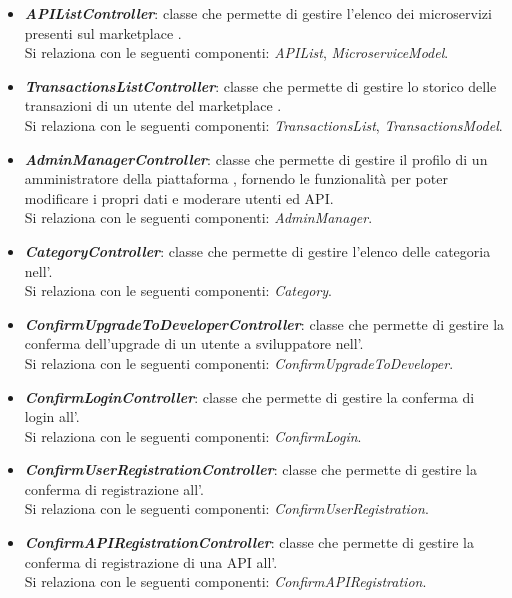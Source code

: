 \begin{itemize}
\begin{itemize}
		\item \textbf{\textit{APIListController}}: classe che permette di gestire l'elenco dei microservizi presenti sul marketplace \progetto.\\
		Si relaziona con le seguenti componenti: \textit{APIList}, \textit{MicroserviceModel}.
		
		\item \textbf{\textit{TransactionsListController}}: classe che permette di gestire lo storico delle transazioni di un utente del marketplace \progetto.\\
		Si relaziona con le seguenti componenti: \textit{TransactionsList}, \textit{TransactionsModel}.
			
		\item \textbf{\textit{AdminManagerController}}: classe che permette di gestire il profilo di un amministratore della piattaforma \progetto, fornendo le funzionalità per poter modificare i propri dati e moderare utenti ed API.\\
		Si relaziona con le seguenti componenti: \textit{AdminManager}.
		
		\item \textbf{\textit{CategoryController}}: classe che permette di gestire l'elenco delle categoria nell'\progetto.\\
		Si relaziona con le seguenti componenti: \textit{Category}.
		
		\item \textbf{\textit{ConfirmUpgradeToDeveloperController}}: classe che permette di gestire la conferma dell'upgrade di un utente a sviluppatore nell'\progetto.\\
		Si relaziona con le seguenti componenti: \textit{ConfirmUpgradeToDeveloper}.
		
		\item \textbf{\textit{ConfirmLoginController}}: classe che permette di gestire la conferma di login all'\progetto.\\
		Si relaziona con le seguenti componenti: \textit{ConfirmLogin}.
		
		\item \textbf{\textit{ConfirmUserRegistrationController}}: classe che permette di gestire la conferma di registrazione all'\progetto.\\
		Si relaziona con le seguenti componenti: \textit{ConfirmUserRegistration}.
		
		\item \textbf{\textit{ConfirmAPIRegistrationController}}: classe che permette di gestire la conferma di registrazione di una API all'\progetto.\\
		Si relaziona con le seguenti componenti: \textit{ConfirmAPIRegistration}.
		

\end{itemize}
\end{itemize}
